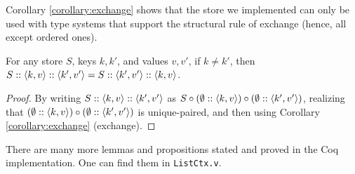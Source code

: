 Corollary \ref{corollary:exchange} shows that the store we implemented can only be used with type systems that support the structural rule of exchange (hence, all except ordered ones).

\begin{lemma}
\label{lemma:append_commut}
For any store $S$, keys $k, k'$, and values $v, v'$, if $k \not= k'$, then $S :: \left\langle k, v \right\rangle :: \left\langle k', v' \right\rangle = S :: \left\langle k', v' \right\rangle :: \left\langle k, v \right\rangle$.
\end{lemma}
\begin{proof}
By writing $S :: \left\langle k, v \right\rangle :: \left\langle k', v' \right\rangle$ as $S \circ (\emptyset :: \left\langle k, v \right\rangle) \circ (\emptyset :: \left\langle k', v' \right\rangle)$, realizing that $(\emptyset :: \left\langle k, v \right\rangle) \circ (\emptyset :: \left\langle k', v' \right\rangle)$ is unique-paired, and then using Corollary \ref{corollary:exchange} (exchange).
\end{proof}

There are many more lemmas and propositions stated and proved in the Coq implementation. One can find them in \texttt{ListCtx.v}.
